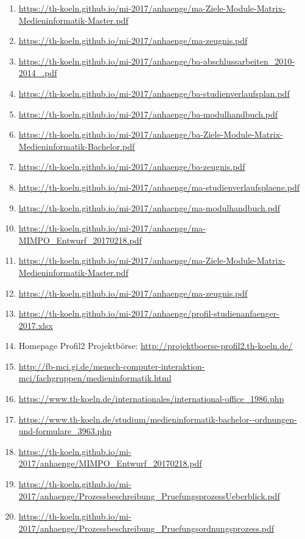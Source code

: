 \documentclass[BCOR12mm,DIV11,titlepage,a4paper,oneside,10pt]{scrbook}
\begin{document}
\begin{sloppypar}
\begin{flushleft}
\begin{enumerate}
\item{\url{https://th-koeln.github.io/mi-2017/anhaenge/ma-Ziele-Module-Matrix-Medieninformatik-Master.pdf}} 
\item{\url{https://th-koeln.github.io/mi-2017/anhaenge/ma-zeugnis.pdf}} 
\item{\url{https://th-koeln.github.io/mi-2017/anhaenge/ba-abschlussarbeiten\_2010-2014\_.pdf}} 
\item{\url{https://th-koeln.github.io/mi-2017/anhaenge/ba-studienverlaufsplan.pdf}} 
\item{\url{https://th-koeln.github.io/mi-2017/anhaenge/ba-modulhandbuch.pdf}} 
\item{\url{https://th-koeln.github.io/mi-2017/anhaenge/ba-Ziele-Module-Matrix-Medieninformatik-Bachelor.pdf}} 
\item{\url{https://th-koeln.github.io/mi-2017/anhaenge/ba-zeugnis.pdf}} 
\item{\url{https://th-koeln.github.io/mi-2017/anhaenge/ma-studienverlaufsplaene.pdf}} 
\item{\url{https://th-koeln.github.io/mi-2017/anhaenge/ma-modulhandbuch.pdf}} 
\item{\url{https://th-koeln.github.io/mi-2017/anhaenge/ma-MIMPO\_Entwurf\_20170218.pdf}} 
\item{\url{https://th-koeln.github.io/mi-2017/anhaenge/ma-Ziele-Module-Matrix-Medieninformatik-Master.pdf}} 
\item{\url{https://th-koeln.github.io/mi-2017/anhaenge/ma-zeugnis.pdf}} 
\item{\url{https://th-koeln.github.io/mi-2017/anhaenge/profil-studienanfaenger-2017.xlsx}} 
\item{Homepage Profil2 Projektbörse: \url{http://projektboerse-profil2.th-koeln.de/} } 
\item{\url{http://fb-mci.gi.de/mensch-computer-interaktion-mci/fachgruppen/medieninformatik.html}} 
\item{\url{https://www.th-koeln.de/internationales/international-office\_1986.php}} 
\item{\url{https://www.th-koeln.de/studium/medieninformatik-bachelor--ordnungen-und-formulare\_3963.php}} 
\item{\url{https://th-koeln.github.io/mi-2017/anhaenge/MIMPO\_Entwurf\_20170218.pdf}} 
\item{\url{https://th-koeln.github.io/mi-2017/anhaenge/Prozessbeschreibung\_PruefungsprozessUeberblick.pdf}} 
\item{\url{https://th-koeln.github.io/mi-2017/anhaenge/Prozessbeschreibung\_Pruefungsordnungsprozess.pdf}} 

\end{enumerate}
\end{flushleft}
\end{sloppypar}
\end{document}

